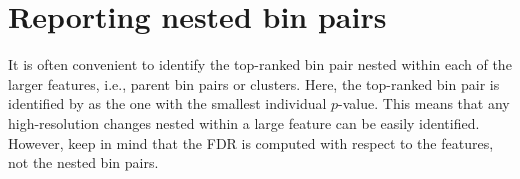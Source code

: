 \documentclass{report}\usepackage[]{graphicx}\usepackage[usenames,dvipsnames]{color}
\newcommand{\hlopt}[1]{\textcolor[rgb]{0,0,0}{#1}}%
\newcommand{\hlstd}[1]{\textcolor[rgb]{0.251,0.251,0.251}{#1}}%
\newcommand{\hlkwb}[1]{\textcolor[rgb]{0,0,0}{#1}}%
\newcommand{\hlkwd}[1]{\textcolor[rgb]{0.878,0.439,0.125}{#1}}%
\newenvironment{knitrout}{}{} %
\begin{document}
\begin{knitrout}
\color{fgcolor}
\end{knitrout}


\section{Reporting nested bin pairs}
\label{sec:nesting}
It is often convenient to identify the top-ranked bin pair nested within each of the larger features, i.e., parent bin pairs or clusters.
Here, the top-ranked bin pair is identified by  as the one with the smallest individual $p$-value.
This means that any high-resolution changes nested within a large feature can be easily identified.
However, keep in mind that the FDR is computed with respect to the features, not the nested bin pairs.
\end{document}
